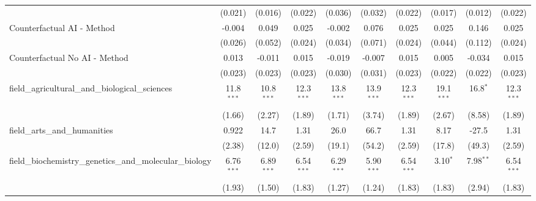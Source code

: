 \begin{tabular}{lccccccccc}
                                                               & (0.021)       & (0.016)        & (0.022)       & (0.036)       & (0.032)       & (0.022)       & (0.017)       & (0.012)        & (0.022)\\   
   Counterfactual AI - Method                                  & -0.004        & 0.049          & 0.025         & -0.002        & 0.076         & 0.025         & 0.025         & 0.146          & 0.025\\   
                                                               & (0.026)       & (0.052)        & (0.024)       & (0.034)       & (0.071)       & (0.024)       & (0.044)       & (0.112)        & (0.024)\\   
   Counterfactual No AI - Method                               & 0.013         & -0.011         & 0.015         & -0.019        & -0.007        & 0.015         & 0.005         & -0.034         & 0.015\\   
                                                               & (0.023)       & (0.023)        & (0.023)       & (0.030)       & (0.031)       & (0.023)       & (0.022)       & (0.022)        & (0.023)\\   
   field\_agricultural\_and\_biological\_sciences              & 11.8$^{***}$  & 10.8$^{***}$   & 12.3$^{***}$  & 13.8$^{***}$  & 13.9$^{***}$  & 12.3$^{***}$  & 19.1$^{***}$  & 16.8$^{*}$     & 12.3$^{***}$\\   
                                                               & (1.66)        & (2.27)         & (1.89)        & (1.71)        & (3.74)        & (1.89)        & (2.67)        & (8.58)         & (1.89)\\   
   field\_arts\_and\_humanities                                & 0.922         & 14.7           & 1.31          & 26.0          & 66.7          & 1.31          & 8.17          & -27.5          & 1.31\\   
                                                               & (2.38)        & (12.0)         & (2.59)        & (19.1)        & (54.2)        & (2.59)        & (17.8)        & (49.3)         & (2.59)\\   
   field\_biochemistry\_genetics\_and\_molecular\_biology      & 6.76$^{***}$  & 6.89$^{***}$   & 6.54$^{***}$  & 6.29$^{***}$  & 5.90$^{***}$  & 6.54$^{***}$  & 3.10$^{*}$    & 7.98$^{**}$    & 6.54$^{***}$\\   
                                                               & (1.93)        & (1.50)         & (1.83)        & (1.27)        & (1.24)        & (1.83)        & (1.83)        & (2.94)         & (1.83)\\   

\end{tabular}
